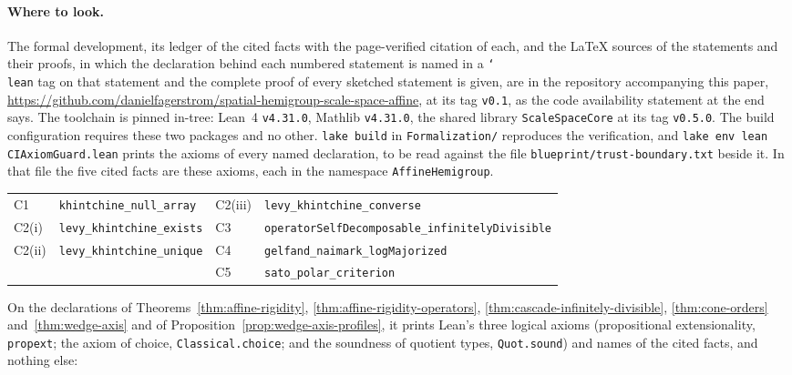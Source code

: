 \paragraph{Where to look.} The formal development, its ledger of the cited facts with the
page-verified citation of each, and the LaTeX sources of the statements and their proofs, in which the
declaration behind each numbered statement is named in a \texttt{\char`\\lean} tag on that statement
and the complete proof of every sketched statement is given, are in the repository accompanying this
paper, \url{https://github.com/danielfagerstrom/spatial-hemigroup-scale-space-affine}, at its tag \texttt{v0.1}, as the code availability statement at
the end says.
The toolchain is pinned in-tree: Lean~4 \texttt{v4.31.0}, Mathlib \texttt{v4.31.0}, the shared
library \texttt{ScaleSpaceCore} at its tag \texttt{v0.5.0}. The build configuration requires these
two packages and no other. \texttt{lake build} in \texttt{Formalization/} reproduces the verification, and
\texttt{lake env lean CIAxiomGuard.lean} prints the axioms of every named declaration, to be read
against the file \texttt{blueprint/trust-boundary.txt} beside it. In that file the five cited facts
are these axioms, each in the namespace \texttt{AffineHemigroup}.
\begin{center}
\small
\begin{tabular}{@{}ll@{\qquad}ll@{}}
C1 & \texttt{khintchine\_null\_array} & C2(iii) & \texttt{levy\_khintchine\_converse} \\
C2(i) & \texttt{levy\_khintchine\_exists} & C3 & \texttt{operatorSelfDecomposable\_infinitelyDivisible} \\
C2(ii) & \texttt{levy\_khintchine\_unique} & C4 & \texttt{gelfand\_naimark\_logMajorized} \\
& & C5 & \texttt{sato\_polar\_criterion}
\end{tabular}
\end{center}
On the declarations of Theorems~\ref{thm:affine-rigidity}, \ref{thm:affine-rigidity-operators},
\ref{thm:cascade-infinitely-divisible}, \ref{thm:cone-orders} and~\ref{thm:wedge-axis} and of
Proposition~\ref{prop:wedge-axis-profiles}, it prints Lean's three logical axioms
(propositional extensionality, \texttt{propext}; the axiom of choice, \texttt{Classical.choice}; and
the soundness of quotient types, \texttt{Quot.sound}) and names of the cited facts, and
nothing else:
